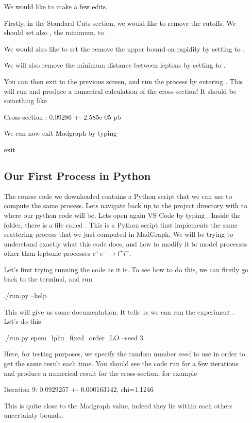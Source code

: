 We would like to make a few edits. 

Firstly, in the Standard Cuts section, we would like to remove the cutoffs. We should set also , the minimum, to .

We would also like to set the remove the upper bound on rapidity by setting  to .

We will also remove the minimum distance between leptons by setting  to .

You can then exit to the previous screen, and run the process by entering . This will run and produce a numerical calculation of the cross-section! It should be something like
\begin{codeenv}
     Cross-section :   0.09286 +- 2.585e-05 pb
\end{codeenv}

We can now exit Madgraph by typing
\begin{codeenv}
    exit
\end{codeenv}

\subsection*{Our First Process in Python}

The course code we downloaded contains a Python script that we can use to compute the same process. Lets navigate back up to the project directory with  to where our python code will be. Lets open again VS Code by typing . Inside the  folder, there is a file called . This is a Python script that implements the same scattering process that we just computed in MadGraph. We will be trying to understand exactly what this code does, and how to modify it to model processes other than leptonic processes $e^+ e^- \to l^+l^-$.

Let's first trying running the code as it is. To see how to do this, we can firstly go back to the terminal, and run
\begin{codeenv}
    ./run.py --help
\end{codeenv}
This will give us some documentation. It tells us we can run the experiment . Let's do this
\begin{codeenv}
    ./run.py epem_lplm_fixed_order_LO --seed 3
\end{codeenv}
Here, for testing purposes, we specify the random number seed to use in order to get the same result each time. You should see the code run for a few iterations and produce a numerical result for the cross-section, for example
\begin{codeenv}
     Iteration 9: 0.0929257 +- 0.000163142, chi=1.1246
\end{codeenv}
This is quite close to the Madgraph value, indeed they lie within each others uncertainty bounds.


